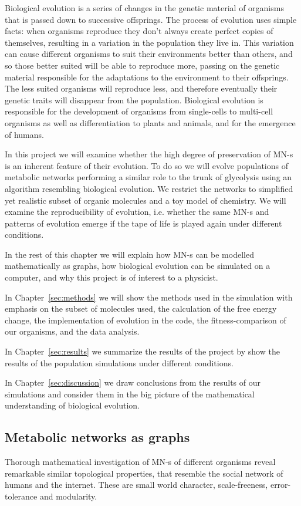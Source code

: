 \documentclass[a4paper,12pt]{article}
\begin{document}
	Biological evolution is a series of changes in the genetic material of organisms that is passed down to successive offsprings. The process of evolution uses simple facts: when organisms reproduce they don't always create perfect copies of themselves, resulting in a variation in the population they live in. This variation can cause different organisms to suit their environments better than others, and so those better suited will be able to reproduce more, passing on the genetic material responsible for the adaptations to the environment to their offsprings. The less suited organisms will reproduce less, and therefore eventually their genetic traits will disappear from the population. 
	 Biological evolution is responsible for the development of organisms from single-cells to multi-cell organisms as well as differentiation to plants and animals, and for the emergence of humans. 



	In this project we will examine whether the high degree of preservation of MN-s is an inherent feature of their evolution. To do so we will evolve populations of metabolic networks performing a similar role to the trunk of glycolysis using an algorithm resembling biological evolution. We restrict the networks to simplified yet realistic subset of organic molecules and a toy model of chemistry. We will examine the reproducibility of evolution, i.e. whether the same MN-s and patterns of evolution emerge if the tape of life is played again under different conditions. 

	In the rest of this chapter we will explain how MN-s can be modelled mathematically as graphs, how biological evolution can be simulated on a computer, and why this project is of interest to a physicist.

	In Chapter~\ref{sec:methods} we will show the methods used in the simulation with emphasis on the subset of molecules used, the calculation of the free energy change, the implementation of evolution in the code, the fitness-comparison of our organisms, and the data analysis. 

	In Chapter~\ref{sec:results} we summarize the results of the project by show the results of the population simulations under different conditions.


	In Chapter~\ref{sec:discussion} we draw conclusions from the results of our simulations and consider them in the big picture of the mathematical understanding of biological evolution. 

	
	\subsection{Metabolic networks as graphs}
	Thorough mathematical investigation of MN-s of different organisms reveal remarkable similar topological properties, that resemble the social network of humans and the internet. These are small world character, scale-freeness, error-tolerance and modularity\cite{largescale}.	
\end{document}
